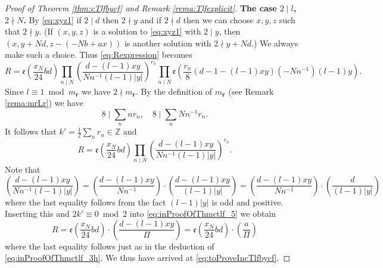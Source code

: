\documentclass[12pt]{amsart}
\numberwithin{equation}{section}
\theoremstyle{plain}
\theoremstyle{definition}
\theoremstyle{remark}
\newcommand\legendre[2]{\genfrac{(}{)}{}{}{#1}{#2}}
\newcommand*\abs[1]{\lvert#1\rvert}
\newcommand\etp[1]{\mathfrak{e}\left(#1\right)}
\newcommand\numZ{\mathbb{Z}}
\begin{document}
\begin{proof}[Proof of Theorem \ref{thm:cTlfbycf} and Remark \ref{rema:Tlfexplicit}]
\textbf{The case $2\mid l$, $2\nmid N$.} By \eqref{eq:xyz1} if $2\mid d$ then $2\nmid y$ and if $2\nmid d$ then we can choose $x,y,z$ such that $2\nmid y$. (If $(x,y,z)$ is a solution to \eqref{eq:xyz1} with $2\mid y$, then $(x,y+Nd,z-(-Nb+ax))$ is another solution with $2\nmid y+Nd$.) We always make such a choice. Thus \eqref{eq:Rexpression} becomes
\begin{equation*}
R=\etp{\frac{x_N}{24}bd}\prod_{n\mid N}\legendre{d-(l-1)xy}{Nn^{-1}(l-1)\abs{y}}^{r_n}\prod_{n\mid N}\etp{\frac{r_n}{8}(d-1-(l-1)xy)(-Nn^{-1})(l-1)y}.
\end{equation*}
Since $l\equiv1\bmod{m_{\mathbf{r}}}$ we have $2\nmid m_{\mathbf{r}}$. By the definition of $m_{\mathbf{r}}$ (see Remark \ref{rema:mrLr}) we have
\begin{equation}
\label{eq:8midx1xN}
8\mid\sum_nnr_n,\quad 8\mid\sum_nNn^{-1}r_n.
\end{equation}
It follows that $k'=\frac{1}{2}\sum_nr_n\in\numZ$ and
\begin{equation}
\label{eq:inProofOfThmctlf_5}
R=\etp{\frac{x_N}{24}bd}\prod_{n\mid N}\legendre{d-(l-1)xy}{Nn^{-1}(l-1)\abs{y}}^{r_n}.
\end{equation}
Note that
\begin{equation*}
\legendre{d-(l-1)xy}{Nn^{-1}(l-1)\abs{y}}=\legendre{d-(l-1)xy}{Nn^{-1}}\cdot\legendre{d-(l-1)xy}{(l-1)\abs{y}}=\legendre{d-(l-1)xy}{Nn^{-1}}\cdot\legendre{d}{(l-1)\abs{y}}
\end{equation*}
where the last equality follows from the fact $(l-1)\abs{y}$ is odd and positive. Inserting this and $2k'\equiv0\bmod{2}$ into \eqref{eq:inProofOfThmctlf_5} we obtain
\begin{equation*}
R=\etp{\frac{x_N}{24}bd}\cdot\legendre{d-(l-1)xy}{\varPi}=\etp{\frac{x_N}{24}bd}\cdot\legendre{a}{\varPi}
\end{equation*}
where the last equality follows just as in the deduction of \eqref{eq:inProofOfThmctlf_3h}. We thus have arrived at \eqref{eq:toProveIncTlfbycf}.


\end{proof}
\end{document}
